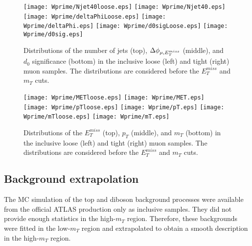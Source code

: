 \begin{figure}[]
  \centering
  \texttt{[image: Wprime/Njet40loose.eps]}
  \texttt{[image: Wprime/Njet40.eps]}
  \texttt{[image: Wprime/deltaPhiLoose.eps]}
  \texttt{[image: Wprime/deltaPhi.eps]}
  \texttt{[image: Wprime/d0sigLoose.eps]}
  \texttt{[image: Wprime/d0sig.eps]}
  \caption{
  Distributions of the number of jets (top), $\Delta\phi_{\mu,E_T^{miss}}$ (middle), 
  and $d_0$ significance (bottom) in the inclusive loose (left) and tight (right) muon samples. 
  The distributions are considered before the $E_T^{miss}$ and $m_T$ cuts.
}
  \label{fig:muMMval1}
\end{figure}
\begin{figure}[]
  \centering
  \texttt{[image: Wprime/METloose.eps]}
  \texttt{[image: Wprime/MET.eps]}
  \texttt{[image: Wprime/pTloose.eps]}
  \texttt{[image: Wprime/pT.eps]}
  \texttt{[image: Wprime/mTloose.eps]}
  \texttt{[image: Wprime/mT.eps]}
  \caption{
  Distributions of the $E_T^{miss}$ (top), $p_T$ (middle), and $m_T$ (bottom)
  in the inclusive loose (left) and tight (right) muon samples. 
  The distributions are considered before the $E_T^{miss}$ and $m_T$ cuts.
}
  \label{fig:muMMval2}
\end{figure}


\subsection{Background extrapolation}

The MC simulation of the top and diboson background processes were available from the official ATLAS production only as inclusive samples.
They did not provide enough statistics in the high-$m_T$ region.
Therefore, these backgrounds were fitted in the low-$m_T$ region and extrapolated to obtain a smooth description in the high-$m_T$ region.

